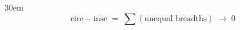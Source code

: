 \documentclass[border=4pt]{standalone}
\begin{document}
\begin{varwidth}{30em}
\large
\[ \text{circ}-\text{insc} \;=\; \textstyle\sum (\text{unequal breadths})\;\longrightarrow\;0 \]

\end{varwidth}
\end{document}
